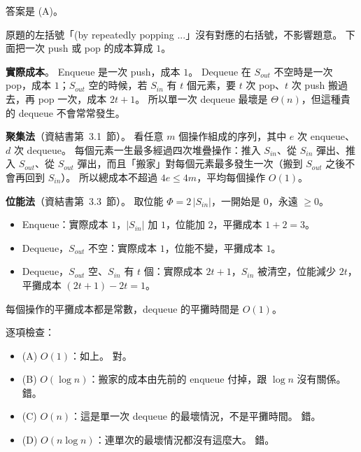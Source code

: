 \begin{pastsoln}
答案是 (A)。

原題的左括號「(by repeatedly popping ...」沒有對應的右括號，不影響題意。 下面把一次 push 或 pop
的成本算成 $1$。

\textbf{實際成本}。 Enqueue 是一次 push，成本 $1$。 Dequeue 在 $S_{out}$ 不空時是一次 pop，成本
$1$；$S_{out}$ 空的時候，若 $S_{in}$ 有 $t$ 個元素，要 $t$ 次 pop、$t$ 次 push 搬過去，再 pop
一次，成本 $2t + 1$。 所以單一次 dequeue 最壞是 $\Theta(n)$，但這種貴的 dequeue 不會常常發生。

\textbf{聚集法}（資結書第~3.1~節）。 看任意 $m$ 個操作組成的序列，其中 $e$ 次 enqueue、$d$ 次
dequeue。 每個元素一生最多經過四次堆疊操作：推入 $S_{in}$、從 $S_{in}$ 彈出、推入 $S_{out}$、從
$S_{out}$ 彈出，而且「搬家」對每個元素最多發生一次（搬到 $S_{out}$ 之後不會再回到 $S_{in}$）。
所以總成本不超過 $4e \le 4m$，平均每個操作 $O(1)$。

\textbf{位能法}（資結書第~3.3~節）。 取位能 $\Phi = 2\,|S_{in}|$，一開始是 $0$，永遠 $\ge 0$。
\begin{itemize}
\item Enqueue：實際成本 $1$，$|S_{in}|$ 加 $1$，位能加 $2$，平攤成本 $1 + 2 = 3$。
\item Dequeue，$S_{out}$ 不空：實際成本 $1$，位能不變，平攤成本 $1$。
\item Dequeue，$S_{out}$ 空、$S_{in}$ 有 $t$ 個：實際成本 $2t + 1$，$S_{in}$ 被清空，位能減少
$2t$，平攤成本 $(2t + 1) - 2t = 1$。
\end{itemize}
每個操作的平攤成本都是常數，dequeue 的平攤時間是 $O(1)$。

逐項檢查：
\begin{itemize}
\item (A) $O(1)$：如上。 對。
\item (B) $O(\log n)$：搬家的成本由先前的 enqueue 付掉，跟 $\log n$ 沒有關係。 錯。
\item (C) $O(n)$：這是單一次 dequeue 的最壞情況，不是平攤時間。 錯。
\item (D) $O(n\log n)$：連單次的最壞情況都沒有這麼大。 錯。
\end{itemize}
\end{pastsoln}
